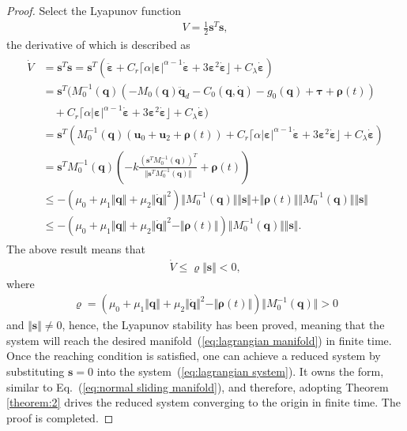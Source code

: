 \documentclass[3p]{elsarticle}
\theoremstyle{plain}
\theoremstyle{remark}
\begin{document}
\begin{proof}
Select the Lyapunov function
\begin{align}
V=\frac{1}{2}\bm s^T\bm s,
\end{align}
the derivative of which is described as
\begin{align}
\begin{split}
\dot V &= \bm s^T\dot{\bm s}=\bm s^T(\ddot{\bm \varepsilon}+C_r\lceil\alpha\vert\bm\varepsilon\vert^{\alpha-1}\dot{\bm \varepsilon}+3\bm \varepsilon^2\dot{\bm \varepsilon}\rfloor+C_\lambda\dot{\bm \varepsilon})\\
&=\bm s^T(M_0^{-1}(\bm q)(-M_0(\bm q)\ddot {\bm q}_d-C_0(\bm q,\dot {\bm q})-g_0(\bm q)+\bm\tau+\bm\rho(t))\\
&\quad+C_r\lceil\alpha\vert\bm\varepsilon\vert^{\alpha-1}\dot{\bm \varepsilon}+3\bm \varepsilon^2\dot{\bm \varepsilon}\rfloor+C_\lambda\dot{\bm \varepsilon})\\
&=\bm s^T(M_0^{-1}(\bm q)(\bm u_0+\bm u_2+\bm\rho(t))+C_r\lceil\alpha\vert\bm\varepsilon\vert^{\alpha-1}\dot{\bm \varepsilon}+3\bm \varepsilon^2\dot{\bm \varepsilon}\rfloor+C_\lambda\dot{\bm \varepsilon})\\
&=\bm s^TM_0^{-1}(\bm q)(-k\frac{(\bm s^TM_0^{-1}(\bm q))^T}{\Vert\bm s^TM_0^{-1}(\bm q)\Vert}+\bm\rho(t))\\
&\le -(\mu_0+\mu_1\Vert\bm q\Vert+\mu_2\Vert\dot{\bm q}\Vert^2)\Vert M_0^{-1}(\bm q)\Vert\Vert \bm s\Vert+\Vert\bm\rho(t)\Vert\Vert M_0^{-1}(\bm q)\Vert\Vert \bm s\Vert\\
&\le -(\mu_0+\mu_1\Vert\bm q\Vert+\mu_2\Vert\dot{\bm q}\Vert^2-\Vert\bm\rho(t)\Vert)\Vert M_0^{-1}(\bm q)\Vert\Vert \bm s\Vert.
\end{split}
\end{align}
The above result means that
\begin{align}
\dot V \le \varrho\Vert\bm s\Vert<0,
\end{align}
where
\begin{align}
\varrho=(\mu_0+\mu_1\Vert\bm q\Vert+\mu_2\Vert\dot{\bm q}\Vert^2-\Vert\bm\rho(t)\Vert)\Vert M_0^{-1}(\bm q)\Vert>0
\end{align}
and $\Vert\bm s\Vert\neq 0$, hence, the Lyapunov stability has been proved, meaning that the system will reach the desired manifold~(\ref{eq:lagrangian manifold}) in finite time. Once the reaching condition is satisfied, one can achieve a reduced system by substituting $\bm s = 0$ into the system~(\ref{eq:lagrangian system}). It owns the form, similar to Eq.~(\ref{eq:normal sliding manifold}), and therefore, adopting Theorem \ref{theorem:2} drives the reduced system converging to the origin in finite time. The proof is completed.
\end{proof}
\end{document}
